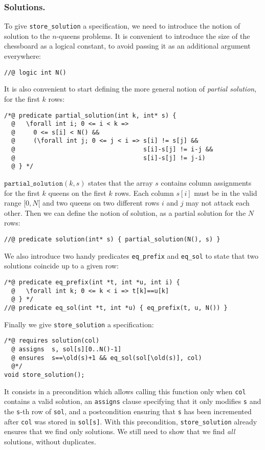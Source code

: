 \documentclass[a4paper]{llncs}
\begin{document}
\subsubsection{Solutions.}
To give \texttt{store\_solution} a specification, we need to introduce
the notion of solution to the $n$-queens problems. It is convenient to
introduce the size of the chessboard as a logical constant, to avoid
passing it as an additional argument everywhere:
\begin{verbatim}
//@ logic int N()
\end{verbatim}
It is also convenient to start defining the more general notion of
\emph{partial solution}, for the first $k$ rows:
\begin{verbatim}
/*@ predicate partial_solution(int k, int* s) {
  @   \forall int i; 0 <= i < k => 
  @     0 <= s[i] < N() &&
  @     (\forall int j; 0 <= j < i => s[i] != s[j] &&
  @                                   s[i]-s[j] != i-j &&
  @                                   s[i]-s[j] != j-i)
  @ } */
\end{verbatim}
$\mathtt{partial\_solution}(k,s)$ states that the array $s$ contains
column assignments for the first $k$ queens on the first $k$
rows. Each column $s[i]$ must be in the valid range $[0,N[$ and two
queens on two different rows $i$ and $j$ may not attack each other.
Then we can define the notion of solution, as a partial solution for
the $N$ rows:
\begin{verbatim}
//@ predicate solution(int* s) { partial_solution(N(), s) }
\end{verbatim}
We also introduce two handy predicates \texttt{eq\_prefix} and
\texttt{eq\_sol} to state that two solutions coincide up to a given row:
\begin{verbatim}
/*@ predicate eq_prefix(int *t, int *u, int i) {
  @   \forall int k; 0 <= k < i => t[k]==u[k]
  @ } */
//@ predicate eq_sol(int *t, int *u) { eq_prefix(t, u, N()) } 
\end{verbatim}
Finally we give \texttt{store\_solution} a specification:
\begin{verbatim}
/*@ requires solution(col)
  @ assigns  s, sol[s][0..N()-1]
  @ ensures  s==\old(s)+1 && eq_sol(sol[\old(s)], col)
  @*/
void store_solution();
\end{verbatim}
It consists in a precondition which allows calling this function only when
\texttt{col} contains a valid solution, an \texttt{assigns} clause
specifying that it only modifies \texttt{s} and the \texttt{s}-th row
of \texttt{sol}, and a postcondition ensuring that \texttt{s} has been
incremented after \texttt{col} was stored in \verb!sol[s]!.
With this precondition, \texttt{store\_solution} already ensures that
we find only solutions. We still need to show that we find \emph{all}
solutions, without duplicates.
\end{document}
